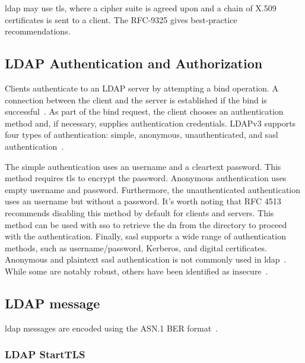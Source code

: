 \gls{ldap} may use \gls{tls}, where a cipher suite is agreed upon and a chain of X.509 certificates is sent to a client.
The RFC-9325 gives best-practice recommendations.

\subsection{LDAP Authentication and Authorization}
Clients authenticate to an LDAP server by attempting a bind operation. 
A connection between the client and the server is established if the bind is successful~\cite{rfc4511, LDAP_RFC_AUTHENTICATION}.
As part of the bind request, the client chooses an authentication method and, if necessary, supplies authentication credentials.
LDAPv3 supports four types of authentication: simple, anonymous, unauthenticated, and \gls{sasl} authentication~\cite{LDAP_RFC_AUTHENTICATION}.

The simple authentication uses an username and a cleartext password.
This method requires \gls{tls} to encrypt the password.
Anonymous authentication uses empty username and password.
Furthermore, the unauthenticated authentication uses an username but without a password.
It's worth noting that RFC 4513~\cite{LDAP_RFC_AUTHENTICATION} recommends disabling this method by default for clients and servers.
This method can be used with \gls{sso} to retrieve the \gls{dn} from the directory to proceed with the authentication.
Finally, \gls{sasl} supports a wide range of authentication methods, such as username/password, Kerberos, and digital certificates.
Anonymous and plaintext \gls{sasl} authentication is not commonly used in \gls{ldap}~\cite{rfc4513}.
While some are notably robust, others have been identified as insecure~\cite{RFC4422SASL}.

\subsection{LDAP message}
\label{subsec:background-ldap-message}
\gls{ldap} messages are encoded using the ASN.1 BER format~\cite{rfc4511}.


\subsubsection{LDAP StartTLS}
\label{subsec:background-ldap-starttls}

